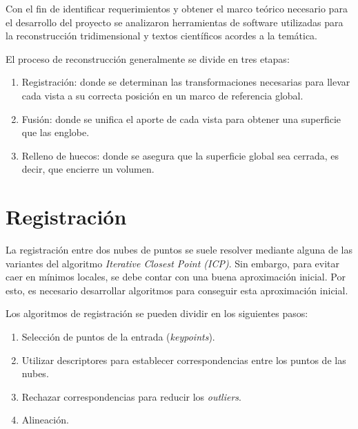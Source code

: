 	Con el fin de identificar requerimientos y obtener el marco teórico
	necesario para el desarrollo del proyecto se analizaron herramientas de
	software utilizadas para la reconstrucción tridimensional y textos
	científicos acordes a la temática.

	El proceso de reconstrucción generalmente se divide en tres etapas:
	\begin{enumerate}
		\item Registración: donde se determinan las transformaciones necesarias
			para llevar cada vista a su correcta posición en un marco de
			referencia global.
		\item Fusión: donde se unifica el aporte de cada vista para obtener una
			superficie que las englobe.
		\item Relleno de huecos: donde se asegura que la superficie global sea
			cerrada, es decir, que encierre un volumen.
	\end{enumerate}




	\section{Registración}
		La registración entre dos nubes de puntos se suele resolver mediante
		alguna de las variantes del algoritmo \emph{Iterative Closest Point (ICP)}.
		Sin embargo, para evitar caer en mínimos locales,
		se debe contar con una buena aproximación inicial.
		Por esto, es necesario desarrollar algoritmos para conseguir esta
		aproximación inicial.\cite{7271006}



		Los algoritmos de registración se pueden dividir en los siguientes pasos:
		\begin{enumerate}
			\item Selección de puntos de la entrada (\emph{keypoints}).
			\item Utilizar descriptores para establecer correspondencias entre los puntos de las nubes.
			\item Rechazar correspondencias para reducir los \emph{outliers}.
			\item Alineación.\cite{conf/3dim/RusinkiewiczL01}
		\end{enumerate}

